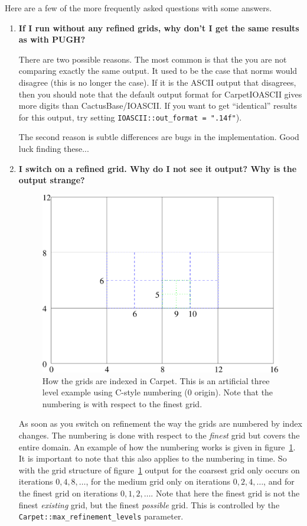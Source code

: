Here are a few of the more frequently asked questions with some
answers.
\begin{enumerate}
\item \textbf{If I run without any refined grids, why don't I get the
    same results as with PUGH?}
  
  There are two possible reasons. The most common is that the you are
  not comparing exactly the same output. It used to be the case that
  norms would disagree (this is no longer the case). If it is the
  ASCII output that disagrees, then you should note that the default
  output format for CarpetIOASCII gives more digits than
  CactusBase/IOASCII. If you want to get ``identical'' results for
  this output, try setting \texttt{IOASCII::out\_format = ".14f"}).

  The second reason is subtle differences are bugs in the
  implementation. Good luck finding these...
\item \textbf{I switch on a refined grid. Why do I not see it output?
    Why is the output strange?} 

\begin{figure}[htbp]
  \begin{center}
    \includegraphics[scale=0.5]{Grid1}
    \caption{How the grids are indexed in Carpet. This is an
      artificial three level example using C-style numbering (0
      origin). Note that the numbering is with respect to the finest
      grid.}
    \label{fig:Grid1}
  \end{center}
\end{figure}
  As soon as you switch on refinement the way the grids are numbered
  by index changes. The numbering is done with respect to the
  \textit{finest} grid but covers the entire domain. An example of how
  the numbering works is given in figure~\ref{fig:Grid1}. It is
  important to note that this also applies to the numbering in
  time. So with the grid structure of figure~\ref{fig:Grid1} output
  for the coarsest grid only occurs on iterations $0,4,8,\dots$, for
  the medium grid only on iterations $0,2,4,\dots$, and for the finest
  grid on iterations $0,1,2,\dots$. Note that here the finest grid is
  not the finest \textit{existing} grid, but the finest
  \textit{possible} grid. This is controlled by the
  \texttt{Carpet::max\_refinement\_levels} parameter.


\end{enumerate}
